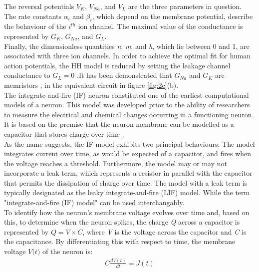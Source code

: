 \noindent The reversal potentials $V_K$, $V_{Na}$, and $V_L$ are the three parameters in question. The rate constants $\alpha_i$ and $\beta_i$, which depend on the membrane potential, describe the behaviour of the $i^{th}$ ion channel. The maximal value of the conductance is represented by $G_K$, $G_{Na}$, and $G_L$. \\

\noindent Finally, the dimensionless quantities \textit{n}, \textit{m}, and \textit{h}, which lie between 0 and 1, are associated with three ion channels. In order to achieve the optimal fit for human action potentials, the HH model is reduced by setting the leakage channel conductance to $G_L = 0$  \cite{noble1962modification}.It has been demonstrated that $G_{Na}$ and $G_K$ are memristors \cite{chua1976memristive}, in the equivalent circuit in figure \ref{fig:2c}(b). \\

\noindent The integrate-and-fire (IF) neuron \cite{lapicque1907louis} constituted one of the earliest computational models of a neuron. This model was developed prior to the ability of researchers to measure the electrical and chemical changes occurring in a functioning neuron. It is based on the premise that the neuron membrane can be modelled as a capacitor that stores charge over time \cite{abbott1999lapicque}.\\

\noindent As the name suggests, the IF model exhibits two principal behaviours: The model integrates current over time, as would be expected of a capacitor, and fires when the voltage reaches a threshold. Furthermore, the model may or may not incorporate a leak term, which represents a resistor in parallel with the capacitor that permits the dissipation of charge over time. The model with a leak term is typically designated as the leaky integrate-and-fire (LIF) model. While the term "integrate-and-fire (IF) model" can be used interchangably. \\

\noindent To identify how the neuron's membrane voltage evolves over time and, based on this, to determine when the neuron spikes, the charge \textit{Q} across a capacitor is represented by $Q = V \times C$, where \textit{V} is the voltage across the capacitor and \textit{C} is the capacitance. By differentiating this with respect to time, the membrane voltage $\textit{V(t)}$ of the neuron is:
\begin{align}
    C \frac{dV(t)}{dt} = J(t) \label{eq:2.6} 
\end{align}

